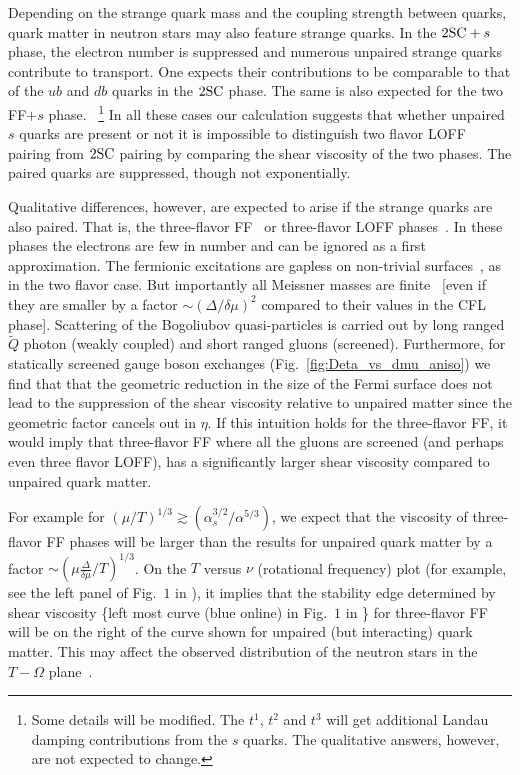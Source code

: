 \documentclass[10pt, aps, prd, superscriptaddress, nofootinbib, 
               amsmath, amssymb, twocolumn,
               preprintnumbers, showpacs,
               raggedbottom,
               floatfix]{revtex4-1}
\newcommand{\SC}{{\rm{SC}}}
\begin{document}
Depending on the strange quark mass and the coupling strength between quarks,
quark matter in neutron stars may also feature strange quarks. In the $2\SC+s$
phase, the electron number is suppressed and numerous unpaired strange quarks
contribute to transport. One expects their contributions to be comparable to
that of the $ub$ and $db$ quarks in the $2\SC$ phase. The same is also expected
for the two FF$+s$ phase. ~\footnote{Some details will be modified. The $t^1$,
$t^2$ and $t^3$ will get additional Landau damping contributions from the $s$
quarks. The qualitative answers, however, are not expected to change.} In all these cases our calculation suggests that whether unpaired $s$ quarks
are present or not it is impossible to distinguish two flavor LOFF pairing from
$2\SC$ pairing by comparing the shear viscosity of the two phases.  The paired
quarks are suppressed, though not exponentially.
  
Qualitative differences, however, are expected to arise if the strange quarks
are also paired. That is, the three-flavor FF~\cite{Mannarelli:2006} or
three-flavor LOFF phases~\cite{Rajagopal:2006ig}. In these phases the electrons
are few in number and can be ignored as a first approximation. The fermionic
excitations are gapless on non-trivial surfaces~\cite{Mannarelli:2006}, as in
the two flavor case. But importantly all Meissner masses are
finite~\cite{Ciminale:2006sm} [even if they are smaller by a factor
$\sim(\Delta/\delta\mu)^2$ compared to their values in the CFL phase].
Scattering of the Bogoliubov quasi-particles is carried out by long ranged
$\tilde{Q}$ photon (weakly coupled) and short ranged gluons (screened).
Furthermore, for statically screened gauge boson exchanges
(Fig.~\ref{fig:Deta_vs_dmu_aniso}) we find that that the geometric reduction in
the size of the Fermi surface does not lead to the suppression of the shear
viscosity relative to unpaired matter since the geometric factor cancels out in
$\eta$. If this intuition holds for the three-flavor FF, it would imply that
three-flavor FF where all the gluons are screened
(and perhaps even three flavor LOFF), has a significantly larger shear viscosity compared to
unpaired quark matter. 

For example for $(\mu/T)^{1/3}\gtrsim (\alpha_s^{3/2}/\alpha^{5/3})$, we expect
that the viscosity of three-flavor FF phases will be larger than the results
for unpaired quark matter by a factor $\sim(\mu\frac{\Delta}{\delta\mu}/T)^{1/3}$.
On the $T$ versus $\nu$ (rotational frequency) plot (for example, see the left 
panel of Fig.~$1$ in \cite{Alford:2013pma}), it implies that the stability edge
determined by shear viscosity \{left most curve (blue online) in Fig.~$1$ in
\cite{Alford:2013pma}\} for three-flavor FF will be on the right of the curve
shown for unpaired (but interacting) quark matter. This may affect the observed
distribution of the neutron stars in the $T-\Omega$ plane~\cite{Levin:1998wa}.
\end{document}
